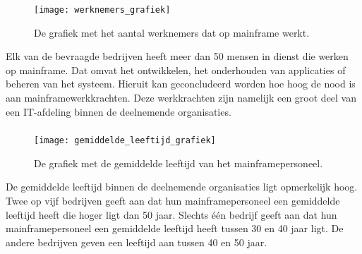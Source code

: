  \subsubsection{}
\label{sec:Wat is het aantal van werknemers die werk leveren dat te maken heeft met het ontwikkelen, onderhouden of beheren van een mainframe?}

 \begin{figure}[h]
    \centering
    \texttt{[image: werknemers\_grafiek]}
    \caption{De grafiek met het aantal werknemers dat op mainframe werkt.}
\end{figure}

Elk van de bevraagde bedrijven heeft meer dan 50 mensen in dienst die werken op mainframe. Dat omvat het ontwikkelen, het onderhouden van applicaties of beheren van het systeem. Hieruit kan geconcludeerd worden hoe hoog de nood is aan mainframewerkkrachten. Deze werkkrachten zijn namelijk een groot deel van een IT-afdeling binnen de deelnemende organisaties.

\newpage

 \subsubsection{}
\label{sec:Wat is de gemiddelde leeftijd van het mainframepersoneel?}

\begin{figure}[h]
    \centering
    \texttt{[image: gemiddelde\_leeftijd\_grafiek]}
    \caption{De grafiek met de gemiddelde leeftijd van het mainframepersoneel.}
\end{figure}


De gemiddelde leeftijd binnen de deelnemende organisaties ligt opmerkelijk hoog. Twee op vijf bedrijven geeft aan dat hun mainframepersoneel een gemiddelde leeftijd heeft die hoger ligt dan 50 jaar. Slechts één bedrijf geeft aan dat hun mainframepersoneel een gemiddelde leeftijd heeft tussen 30 en 40 jaar ligt. De andere bedrijven geven een leeftijd aan tussen 40 en 50 jaar. 

\newpage 

  \subsubsection{}
 \label{sec:Zijn er opmerkelijk signalen die aangeven of er een tekort is aan nieuwe mainframe-experten?}
 

